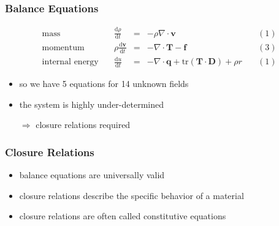 \documentclass[hide notes,intlimits]{beamer}
\begin{document}
\begin{frame}
  \frametitle{Balance Equations}
  \begin{equation*}
  \begin{array}{lcclc}
    \text{mass} \quad &  \frac{\text{d} \rho}{\text{d} t} & = & -\rho\nabla \cdot \mathbf{v} \quad & (1)\\[.25em]
    \text{momentum} \quad & \rho \frac{\text{d} \mathbf{v}}{\text{d} t} & = & -\nabla \cdot \mathbf{T} - \mathbf{f} \quad & (3) \\[.25em]
    \text{internal energy} \quad & \frac{\text{d} u}{\text{d} t} & = & - \nabla \cdot \mathbf{q} + \text{tr} \left(\mathbf{T}\cdot\mathbf{D}\right) + \rho r\quad & (1)
  \end{array}
  \end{equation*}
  \begin{itemize}
   \item so we have 5 equations for 14 unknown fields
   \item the system is highly under-determined
   \item[$\Rightarrow$] \alert{closure relations} required
 \end{itemize}
\end{frame}


\begin{frame}
  \frametitle{Closure Relations}
  \begin{itemize}
    \item \alert{balance equations} are universally valid
    \item \alert{closure relations} describe the specific behavior of a material
    \item \alert{closure relations} are often called \alert{constitutive equations}
  \end{itemize}
\end{frame}
\end{document}

